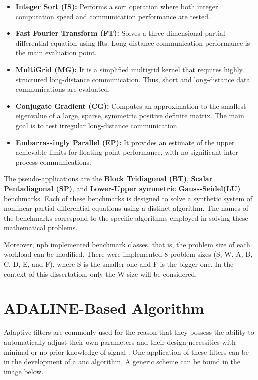 \begin{itemize}
    \item \textbf{Integer Sort (IS):} Performs a sort operation where both integer computation speed and communication performance are tested.

    \item \textbf{Fast Fourier Transform (FT):} Solves a three-dimensional partial differential equation using \glspl{fft}. 
        Long-distance communication performance is the main evaluation point. 

    \item \textbf{MultiGrid (MG):} It is a simplified multigrid kernel that requires highly structured long-distance communication. Thus, short and 
        long-distance data communications are evaluated.

    \item \textbf{Conjugate Gradient (CG):} Computes an approximation to
    the smallest eigenvalue of a large, sparse, symmetric positive definite matrix. The main goal is to test irregular long-distance communication.

    \item \textbf{Embarrassingly Parallel (EP):} It provides an estimate of the
    upper achievable limits for floating point performance, with no significant inter-process communications.
\end{itemize}

The pseudo-applications are the \textbf{Block Tridiagonal (BT)}, \textbf{Scalar Pentadiagonal (SP)}, and 
\textbf{Lower-Upper symmetric Gauss-Seidel(LU)} benchmarks. Each of these benchmarks is designed to solve a synthetic system of nonlinear partial 
differential equations using a distinct algorithm. The names of the benchmarks correspond to the specific algorithms employed in solving these 
mathematical problems.

Moreover, \gls{npb} implemented benchmark classes, that is, the problem size of each workload can be modified. There were implemented 8 problem 
sizes (S, W, A, B, C, D, E, and F), where S is the smaller one and F is the bigger one. In the context of this dissertation, only the W size 
will be considered.


\section{ADALINE-Based Algorithm}

Adaptive filters are commonly used for the reason that they possess the ability to automatically adjust their own parameters and their 
design necessities with minimal or no prior knowledge of signal \cite{haykin1996linear}. One application of these filters can be in the development 
of a \gls{anc} algorithm. A generic scheme can be found in the image below.

